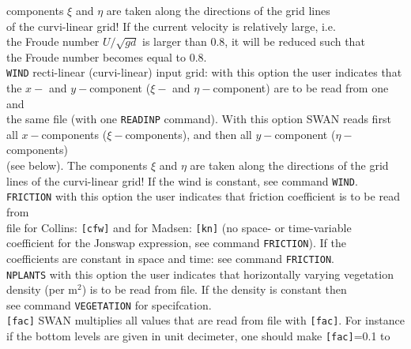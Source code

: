 \documentclass[12pt]{book}
\begin{document}
\begin{tabbing}
                       components  $\xi$ and $\eta$ are taken along the directions of the grid lines\\
                       of the curvi-linear grid! If the current velocity is relatively large, i.e.\\
                       the Froude number $U/ \sqrt{g d}$ is larger than 0.8, it will be reduced such that\\
                       the Froude number becomes equal to 0.8.\-\\
{\tt WIND}          \> recti-linear (curvi-linear) input grid: with this option the user indicates that\+\\
                       the $x-$ and $y-$component ($\xi-$ and $\eta-$component) are to be read from one and\\
                       the same file (with one {\tt READINP} command). With this option SWAN reads first\\
                       all $x-$components ($\xi-$components), and then all $y-$component ($\eta-$components)\\
                       (see below). The components $\xi$ and $\eta$  are taken along the directions of the grid\\
                       lines of the curvi-linear grid! If the wind is constant, see command {\tt WIND}.\-\\
{\tt FRICTION}      \> with this option the user indicates that friction coefficient is to be read from\+\\
                       file for Collins: {\tt [cfw]} and for Madsen: {\tt [kn]} (no space- or time-variable\\
                       coefficient for the Jonswap expression, see command {\tt FRICTION}). If the\\
                       coefficients are constant in space and time: see command {\tt FRICTION}.\-\\
{\tt NPLANTS}       \> with this option the user indicates that horizontally varying vegetation\+\\
                       density (per m$^2$) is to be read from file. If the density is constant then\\
                       see command {\tt VEGETATION} for specifcation.\-\\
{\tt [fac]}         \> SWAN multiplies all values that are read from file with {\tt [fac]}. For instance\+\\
                       if the bottom levels are given in unit decimeter, one should make {\tt [fac]}=0.1 to\\

\end{tabbing}
\end{document}
